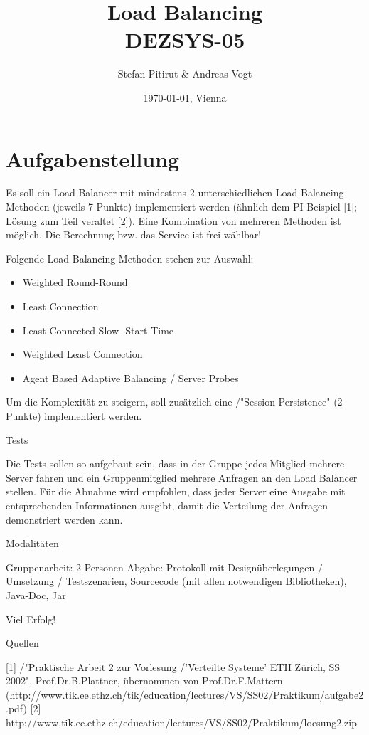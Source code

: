 \documentclass[11pt,a4paper]{article}
\title{Load Balancing\\ DEZSYS-05}
\author{Stefan Pitirut \& Andreas Vogt}
\date{\today{}, Vienna}
\begin{document}
\maketitle

\newpage
\tableofcontents

\newpage
\section{Aufgabenstellung}
Es soll ein Load Balancer mit mindestens 2 unterschiedlichen Load-Balancing Methoden (jeweils 7 Punkte) implementiert werden (ähnlich dem PI Beispiel [1]; Lösung zum Teil veraltet [2]). Eine Kombination von mehreren Methoden ist möglich. Die Berechnung bzw. das Service ist frei wählbar!

Folgende Load Balancing Methoden stehen zur Auswahl:
\begin{itemize}
	\item Weighted Round-Round
	\item Least Connection
	\item Least Connected Slow- Start Time
	\item Weighted Least Connection
	\item Agent Based Adaptive Balancing / Server Probes
\end{itemize}

Um die Komplexität zu steigern, soll zusätzlich eine /"Session Persistence" (2 Punkte) implementiert werden.

Tests

Die Tests sollen so aufgebaut sein, dass in der Gruppe jedes Mitglied mehrere Server fahren und ein Gruppenmitglied mehrere Anfragen an den Load Balancer stellen. Für die Abnahme wird empfohlen, dass jeder Server eine Ausgabe mit entsprechenden Informationen ausgibt, damit die Verteilung der Anfragen demonstriert werden kann.


Modalitäten

Gruppenarbeit: 2 Personen
Abgabe: Protokoll mit Designüberlegungen / Umsetzung / Testszenarien, Sourcecode (mit allen notwendigen Bibliotheken), Java-Doc, Jar


Viel Erfolg!


Quellen

[1] /"Praktische Arbeit 2 zur Vorlesung /'Verteilte Systeme' ETH Zürich, SS 2002", Prof.Dr.B.Plattner, übernommen von Prof.Dr.F.Mattern (http://www.tik.ee.ethz.ch/tik/education/lectures/VS/SS02/Praktikum/aufgabe2.pdf)
[2] http://www.tik.ee.ethz.ch/education/lectures/VS/SS02/Praktikum/loesung2.zip
\end{document}
